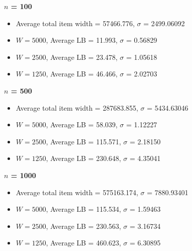 \documentclass[oribibl]{llncs}
\begin{document}
\textbf{$n$ = 100}
\begin{itemize}
	\item Average total item width = 57466.776, $\sigma$ = 2499.06092
	\item $W = 5000$, Average LB = 11.993, $\sigma$ = 0.56829
	\item $W = 2500$, Average LB = 23.478, $\sigma$ = 1.05618
	\item $W = 1250$, Average LB = 46.466, $\sigma$ = 2.02703 
\end{itemize}

\textbf{$n$ = 500}
\begin{itemize}
	\item Average total item width = 287683.855, $\sigma$ = 5434.63046
	\item $W = 5000$, Average LB = 58.039, $\sigma$ = 1.12227
	\item $W = 2500$, Average LB = 115.571, $\sigma$ = 2.18150
	\item $W = 1250$, Average LB = 230.648, $\sigma$ = 4.35041 
\end{itemize}

\textbf{$n$ = 1000}
\begin{itemize}
	\item Average total item width = 575163.174, $\sigma$ = 7880.93401
	\item $W = 5000$, Average LB = 115.534, $\sigma$ = 1.59463
	\item $W = 2500$, Average LB = 230.563, $\sigma$ = 3.16734
	\item $W = 1250$, Average LB = 460.623, $\sigma$ = 6.30895 
\end{itemize}




\end{document}
